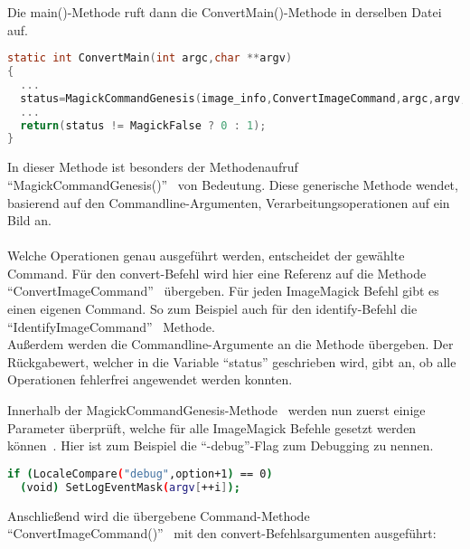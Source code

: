 Die main()-Methode ruft dann die ConvertMain()-Methode in derselben Datei~\cite{DeklarationConvertMain} auf.

\begin{lstlisting}[firstnumber=67, language=C, caption=utilities/convert.c ConvertMain(),label={lst:lstlisting}]
static int ConvertMain(int argc,char **argv)
{
  ...
  status=MagickCommandGenesis(image_info,ConvertImageCommand,argc,argv,(char **) NULL,exception);
  ...
  return(status != MagickFalse ? 0 : 1);
}
\end{lstlisting}
\vspace{5mm}

In dieser Methode ist besonders der Methodenaufruf "`MagickCommandGenesis()"'~\cite{AufbauMagickCommandGenesis} von Bedeutung.
Diese generische Methode wendet, basierend auf den Commandline-Argumenten, Verarbeitungsoperationen auf ein Bild an.\\\\
Welche Operationen genau ausgeführt werden, entscheidet der gewählte Command.
Für den convert-Befehl wird hier eine Referenz auf die Methode "`ConvertImageCommand"'~\cite{DeklarationConvertIMageCommand} übergeben.
Für jeden ImageMagick Befehl gibt es einen eigenen Command.
So zum Beispiel auch für den identify-Befehl die "`IdentifyImageCommand"'~\cite{DeklarationIdentifyImageCommand} Methode.\\

Außerdem werden die Commandline-Argumente an die Methode übergeben.
Der Rückgabewert, welcher in die Variable "`status"' geschrieben wird, gibt an, ob alle Operationen fehlerfrei angewendet werden konnten.\\

\newpage

Innerhalb der MagickCommandGenesis-Methode~\cite{DeklaraitionMagickCommandGenesis} werden nun zuerst einige Parameter überprüft, welche für alle ImageMagick Befehle gesetzt werden können~\cite{MagickCommandGenesisDebugFlag}.
Hier ist zum Beispiel die "`-debug"'-Flag zum Debugging zu nennen.

\begin{lstlisting}[firstnumber=158, language=Bash, caption=wand/migrify.c Debugging Flag in der MagickCommandGenesis-Methode,label={lst:migrifydebug}]
if (LocaleCompare("debug",option+1) == 0)
  (void) SetLogEventMask(argv[++i]);
\end{lstlisting}
\vspace{5mm}

Anschließend wird die übergebene Command-Methode "`ConvertImageCommand()"'~\cite{MagickCommandGenesisCommandAufruf} mit den convert-Befehlsargumenten ausgeführt:

